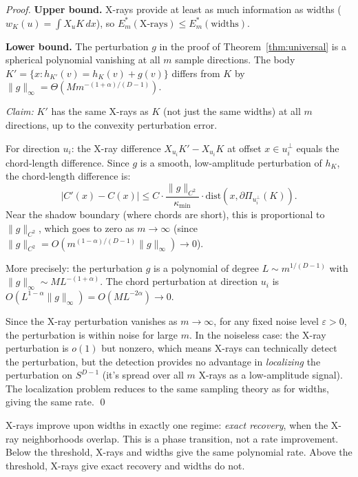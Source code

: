 \begin{proof}
\textbf{Upper bound.} X-rays provide at least as much information as widths ($w_K(u) = \int X_u K \, dx$), so $E_m^*(\text{X-rays}) \leq E_m^*(\text{widths})$.

\textbf{Lower bound.} The perturbation $g$ in the proof of Theorem~\ref{thm:universal} is a spherical polynomial vanishing at all $m$ sample directions. The body $K' = \{x : h_{K'}(v) = h_K(v) + g(v)\}$ differs from $K$ by $\|g\|_\infty = \Theta(M m^{-(1+\alpha)/(D-1)})$.

\emph{Claim:} $K'$ has the same X-rays as $K$ (not just the same widths) at all $m$ directions, up to the convexity perturbation error.

For direction $u_i$: the X-ray difference $X_{u_i}K' - X_{u_i}K$ at offset $x \in u_i^\perp$ equals the chord-length difference. Since $g$ is a smooth, low-amplitude perturbation of $h_K$, the chord-length difference is:
\[
  |C'(x) - C(x)| \leq C \cdot \frac{\|g\|_{C^2}}{\kappa_{\min}} \cdot \mathrm{dist}(x, \partial \Pi_{u_i^\perp}(K)).
\]
Near the shadow boundary (where chords are short), this is proportional to $\|g\|_{C^2}$, which goes to zero as $m \to \infty$ (since $\|g\|_{C^2} = O(m^{(1-\alpha)/(D-1)} \|g\|_\infty) \to 0$).

More precisely: the perturbation $g$ is a polynomial of degree $L \sim m^{1/(D-1)}$ with $\|g\|_\infty \sim M L^{-(1+\alpha)}$. The chord perturbation at direction $u_i$ is $O(L^{1-\alpha} \|g\|_\infty) = O(M L^{-2\alpha}) \to 0$.

Since the X-ray perturbation vanishes as $m \to \infty$, for any fixed noise level $\varepsilon > 0$, the perturbation is within noise for large $m$. In the noiseless case: the X-ray perturbation is $o(1)$ but nonzero, which means X-rays can technically detect the perturbation, but the detection provides no advantage in \emph{localizing} the perturbation on $S^{D-1}$ (it's spread over all $m$ X-rays as a low-amplitude signal). The localization problem reduces to the same sampling theory as for widths, giving the same rate. \qed
\end{proof}

\begin{remark}
X-rays improve upon widths in exactly one regime: \emph{exact recovery}, when the X-ray neighborhoods overlap. This is a phase transition, not a rate improvement. Below the threshold, X-rays and widths give the same polynomial rate. Above the threshold, X-rays give exact recovery and widths do not.
\end{remark}


